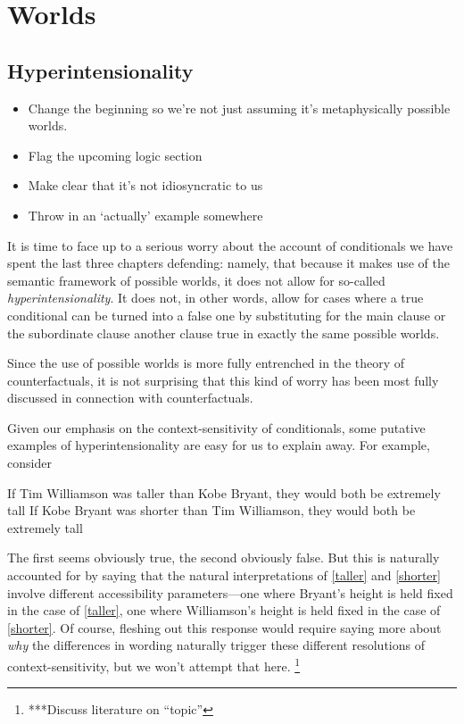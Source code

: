 \documentclass[If.tex]{subfiles}
\begin{document}
\chapter{Worlds}
\label{chap:worlds}

\section{Hyperintensionality}
\label{sect:hyperintensionality}
\begin{itemize}
	\item
	Change the beginning so we're not just assuming it's metaphysically possible worlds.
	\item
	Flag the upcoming logic section
	\item
	Make clear that it's not idiosyncratic to us
	\item
	Throw in an ‘actually’ example somewhere
\end{itemize}


It is time to face up to a serious worry about the account of conditionals we have spent the last three chapters defending: namely, that because it makes use of the semantic framework of possible worlds, it does not allow for so-called \emph{hyperintensionality}.  It does not, in other words, allow for cases where a true conditional can be turned into a false one by substituting for the main clause or the subordinate clause another clause true in exactly the same possible worlds.  

Since the use of possible worlds is more fully entrenched in the theory of counterfactuals, it is not surprising that this kind of worry has been most fully discussed in connection with counterfactuals.  

Given our emphasis on the context-sensitivity of conditionals, some putative examples of hyperintensionality are easy for us to explain away.  For example, consider 
\begin{prop}
	\nitem 
	\begin{prop}
		\aitem \label{taller}
		If Tim Williamson was taller than Kobe Bryant, they would both be extremely tall
		\aitem \label{shorter}
		If Kobe Bryant was shorter than Tim Williamson, they would both be extremely tall
	\end{prop}
\end{prop}
The first seems obviously true, the second obviously false.  But this is naturally accounted for by saying that the natural interpretations of \ref{taller} and \ref{shorter} involve different accessibility parameters---one where Bryant's height is held fixed in the case of \ref{taller}, one where Williamson's height is held fixed in the case of \ref{shorter}.  Of course, fleshing out this response would require saying more about \emph{why} the differences in wording naturally trigger these different resolutions of context-sensitivity, but we won't attempt that here.%
\footnote{***Discuss literature on “topic”}
\end{document}
